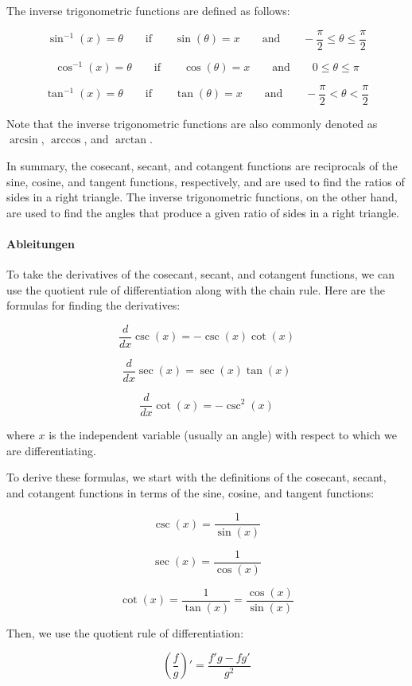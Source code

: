 \documentclass{report}
\begin{document}
The inverse trigonometric functions are defined as follows:

$$\sin^{-1}(x) = \theta \qquad \text{if} \qquad \sin(\theta) = x \qquad \text{and} \qquad -\frac{\pi}{2} \leq \theta \leq \frac{\pi}{2}$$

$$\cos^{-1}(x) = \theta \qquad \text{if} \qquad \cos(\theta) = x \qquad \text{and} \qquad 0 \leq \theta \leq \pi$$

$$\tan^{-1}(x) = \theta \qquad \text{if} \qquad \tan(\theta) = x \qquad \text{and} \qquad -\frac{\pi}{2} < \theta < \frac{\pi}{2}$$

Note that the inverse trigonometric functions are also commonly denoted as
$\arcsin$, $\arccos$, and $\arctan$.

In summary, the cosecant, secant, and cotangent functions are reciprocals of
the sine, cosine, and tangent functions, respectively, and are used to find the
ratios of sides in a right triangle. The inverse trigonometric functions, on
the other hand, are used to find the angles that produce a given ratio of sides
in a right triangle.



\paragraph{Ableitungen} %
\label{par:Ableitungen}
To take the derivatives of the cosecant, secant, and cotangent functions, we
can use the quotient rule of differentiation along with the chain rule. Here
are the formulas for finding the derivatives:

$$\frac{d}{dx} \csc(x) = -\csc(x) \cot(x)$$

$$\frac{d}{dx} \sec(x) = \sec(x) \tan(x)$$

$$\frac{d}{dx} \cot(x) = -\csc^2(x)$$

where $x$ is the independent variable (usually an angle) with respect to which
we are differentiating.

To derive these formulas, we start with the definitions of the cosecant,
secant, and cotangent functions in terms of the sine, cosine, and tangent
functions:

$$\csc(x) = \frac{1}{\sin(x)}$$

$$\sec(x) = \frac{1}{\cos(x)}$$

$$\cot(x) = \frac{1}{\tan(x)} = \frac{\cos(x)}{\sin(x)}$$

Then, we use the quotient rule of differentiation:

$$\left(\frac{f}{g}\right)' = \frac{f'g - fg'}{g^2}$$
\end{document}
